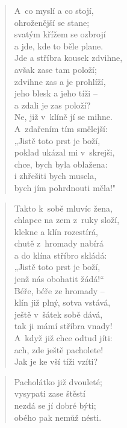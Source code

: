 \begin{verse}
A~co myslí a co stojí, \\
ohroženější se stane; \\
svatým křížem se ozbrojí \\
a jde, kde to běle plane. \\
Jde a stříbra kousek zdvihne, \\
avšak zase tam položí; \\
zdvihne zas a je prohlíží, \\
jeho blesk a jeho tíži -- \\
a zdali je zas položí? \\
Ne, již v~klíně jí se mihne. \\
A~zdařením tím smělejší: \\
„Jistě toto prst je boží, \\
poklad ukázal mi v~skrejši, \\
chce, bych byla oblažena: \\
i zhřešiti bych musela, \\
bych jím pohrdnouti měla!"
\end{verse}

\begin{verse}
Takto k~sobě mluvíc žena, \\
chlapce na zem z~ruky složí, \\
klekne a klín rozestírá, \\
chutě z~hromady nabírá \\
a do klína stříbro skládá: \\
„Jistě toto prst je boží, \\
jenž nás obohatit žádá!“ \\
Béře, béře ze hromady -- \\
klín již plný, sotva vstává, \\
ještě v~šátek sobě dává, \\
tak ji mámí stříbra vnady! \\
A~když již chce odtud jíti: \\
ach, zde ještě pacholete! \\
Jak je ke vší tíži vzíti?
\end{verse}

\begin{verse}
Pacholátko již dvouleté; \\
vysypati zase štěstí \\
nezdá se jí dobré býti; \\
obého pak nemůž nésti.
\end{verse}

